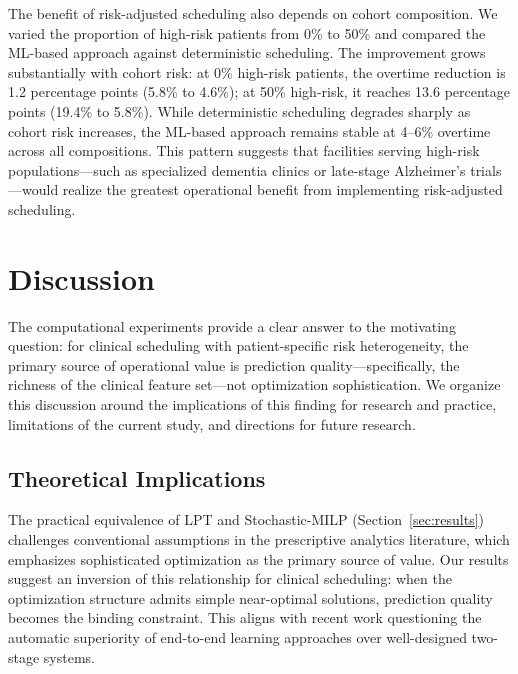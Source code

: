 \documentclass[11pt,a4paper]{article}
\begin{document}
The benefit of risk-adjusted scheduling also depends on cohort composition. We varied the proportion of high-risk patients from 0\% to 50\% and compared the ML-based approach against deterministic scheduling. The improvement grows substantially with cohort risk: at 0\% high-risk patients, the overtime reduction is 1.2 percentage points (5.8\% to 4.6\%); at 50\% high-risk, it reaches 13.6 percentage points (19.4\% to 5.8\%). While deterministic scheduling degrades sharply as cohort risk increases, the ML-based approach remains stable at 4--6\% overtime across all compositions. This pattern suggests that facilities serving high-risk populations---such as specialized dementia clinics or late-stage Alzheimer's trials---would realize the greatest operational benefit from implementing risk-adjusted scheduling.



\section{Discussion}
\label{sec:discussion}

The computational experiments provide a clear answer to the motivating question: for clinical scheduling with patient-specific risk heterogeneity, the primary source of operational value is prediction quality---specifically, the richness of the clinical feature set---not optimization sophistication. We organize this discussion around the implications of this finding for research and practice, limitations of the current study, and directions for future research.

\subsection{Theoretical Implications}

The practical equivalence of LPT and Stochastic-MILP (Section~\ref{sec:results}) challenges conventional assumptions in the prescriptive analytics literature, which emphasizes sophisticated optimization as the primary source of value. Our results suggest an inversion of this relationship for clinical scheduling: when the optimization structure admits simple near-optimal solutions, prediction quality becomes the binding constraint. This aligns with recent work questioning the automatic superiority of end-to-end learning approaches over well-designed two-stage systems.
\end{document}

